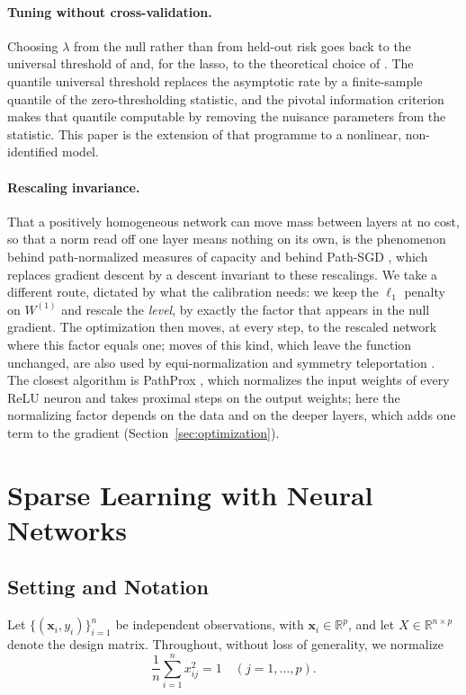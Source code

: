 \documentclass[twoside,11pt]{article}
\newcommand{\bx}{\mathbf{x}}
\newcommand{\Wone}{W^{(1)}}
\newcommand{\R}{\mathbb{R}}
\begin{document}
\paragraph{Tuning without cross-validation.} Choosing $\lambda$ from the null rather than from held-out risk goes back to the universal threshold of \citet{Dono94b} and, for the lasso, to the theoretical choice of \citet{BRT2009}. The quantile universal threshold \citep{QUT2017} replaces the asymptotic rate by a finite-sample quantile of the zero-thresholding statistic, and the pivotal information criterion \citep{PIC-SMS2026} makes that quantile computable by removing the nuisance parameters from the statistic. This paper is the extension of that programme to a nonlinear, non-identified model.

\paragraph{Rescaling invariance.} That a positively homogeneous network can move mass between layers at no cost, so that a norm read off one layer means nothing on its own, is the phenomenon behind path-normalized measures of capacity \citep{neyshabur2015norm} and behind Path-SGD \citep{neyshabur2015path}, which replaces gradient descent by a descent invariant to these rescalings. We take a different route, dictated by what the calibration needs: we keep the $\ell_1$ penalty on $\Wone$ and rescale the \emph{level}, by exactly the factor that appears in the null gradient. The optimization then moves, at every step, to the rescaled network where this factor equals one; moves of this kind, which leave the function unchanged, are also used by equi-normalization \citep{ENorm} and symmetry teleportation \citep{Teleportation}. The closest algorithm is PathProx \citep{PathProx}, which normalizes the input weights of every ReLU neuron and takes proximal steps on the output weights; here the normalizing factor depends on the data and on the deeper layers, which adds one term to the gradient (Section~\ref{sec:optimization}).

\section{Sparse Learning with Neural Networks}\label{sec:setting-problem}

\subsection{Setting and Notation}\label{sec:setting}
Let $\{(\bx_i,y_i)\}_{i=1}^n$ be independent observations, with
$\bx_i\in\R^p$, and let $X\in\R^{n\times p}$ denote the design matrix. Throughout, without loss of generality, we normalize
\begin{equation*}
    \frac{1}{n}\sum_{i=1}^n x_{ij}^2=1\quad (j=1, \ldots, p).
\end{equation*}
\end{document}
